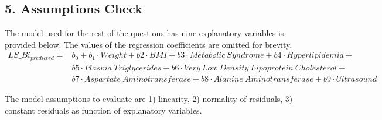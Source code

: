 \documentclass{article}
\begin{document}
\subsection{5. Assumptions Check}
The model used for the rest of the questions has nine explanatory variables is provided below. The values of the regression coefficients are omitted for brevity.
\begin{align*}
LS\_Bi_{predicted} = &b_0 + b_1\cdot Weight + b2\cdot BMI + b3\cdot Metabolic\ Syndrome + b4\cdot Hyperlipidemia + \\ &b5 \cdot Plasma\ Triglycerides + b6\cdot Very\ Low\ Density\ Lipoprotein\ Cholesterol + \\ &b7 \cdot Aspartate\ Aminotransferase + b8 \cdot Alanine\ Aminotransferase + b9\cdot Ultrasound
\end{align*}

The model assumptions to evaluate are 1) linearity, 2) normality of residuals, 3) constant residuals as function of explanatory variables.\\
\end{document}

